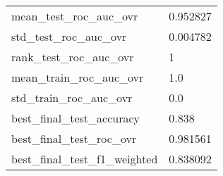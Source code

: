 \begin{tabular}{ll}
mean\_test\_roc\_auc\_ovr         &                                           0.952827 \\
std\_test\_roc\_auc\_ovr          &                                           0.004782 \\
rank\_test\_roc\_auc\_ovr         &                                                  1 \\
mean\_train\_roc\_auc\_ovr        &                                                1.0 \\
std\_train\_roc\_auc\_ovr         &                                                0.0 \\
best\_final\_test\_accuracy      &                                              0.838 \\
best\_final\_test\_roc\_ovr       &                                           0.981561 \\
best\_final\_test\_f1\_weighted   &                                           0.838092 \\
\bottomrule
\end{tabular}
